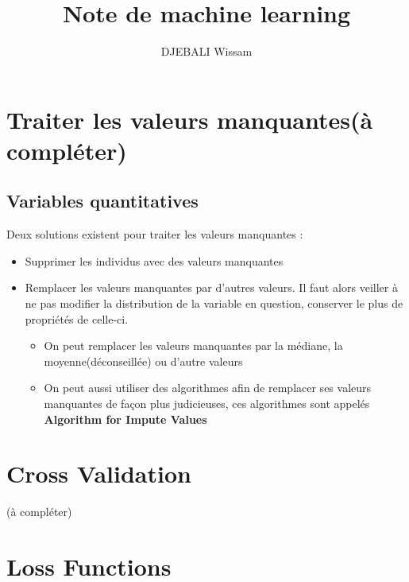 \documentclass[french]{article}
\title{Note de machine learning}
\author{DJEBALI Wissam}
\begin{document}
	
    \maketitle
	\section{Traiter les valeurs manquantes(à compléter)}
	\subsection{Variables quantitatives}
Deux solutions existent pour traiter les valeurs manquantes : 
	\begin{itemize}[label=\textbullet, font=\LARGE \color{orange}]
		\item Supprimer les individus avec des valeurs manquantes
		\item Remplacer les valeurs manquantes par d'autres valeurs. Il faut alors veiller à ne pas modifier la distribution de la variable en question, conserver le plus de propriétés de celle-ci.
		\begin{itemize}[label=*]
			\item On peut remplacer les valeurs manquantes par la médiane, la moyenne(déconseillée) ou d'autre valeurs
			\item On peut aussi utiliser des algorithmes afin de remplacer ses valeurs manquantes de façon plus judicieuses, ces algorithmes sont appelés \textbf{Algorithm for Impute Values}
		\end{itemize}
	\end{itemize}
	
	
	\section{Cross Validation}
	(à compléter)
	
    \section{Loss Functions}
\end{document}
